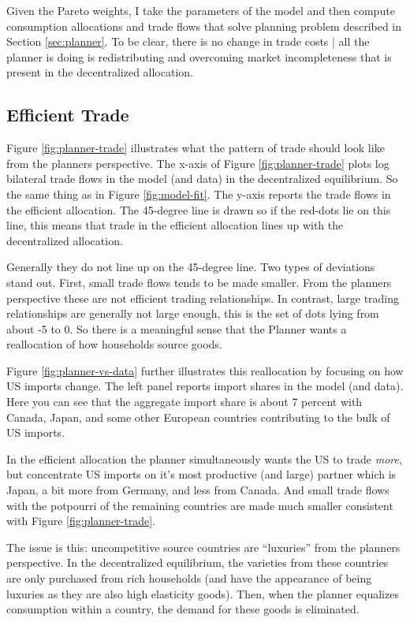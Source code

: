 \documentclass[12pt,pdftex]{article}
\begin{document}
\begin{onehalfspacing}
Given the Pareto weights, I take the parameters of the model and then compute consumption allocations and trade flows that solve planning problem described in Section \ref{sec:planner}. To be clear, there is no change in trade costs | all the planner is doing is redistributing and overcoming market incompleteness that is present in the decentralized allocation.

\subsection{Efficient Trade}

Figure \ref{fig:planner-trade} illustrates what the pattern of trade should look like from the planners perspective. The x-axis of Figure \ref{fig:planner-trade} plots log bilateral trade flows in the model (and data) in the decentralized equilibrium. So the same thing as in Figure \ref{fig:model-fit}. The y-axis reports the trade flows in the efficient allocation. The 45-degree line is drawn so if the red-dots lie on this line, this means that trade in the efficient allocation lines up with the decentralized allocation.

Generally they do not line up on the 45-degree line. Two types of deviations stand out. First, small trade flows tends to be made smaller. From the planners perspective these are not efficient trading relationships. In contrast, large trading relationships are generally not large enough, this is the set of dots lying from about -5 to 0. So there is a meaningful sense that the Planner wants a reallocation of how households source goods.

Figure \ref{fig:planner-vs-data} further illustrates this reallocation by focusing on how US imports change. The left panel reports import shares in the model (and data). Here you can see that the aggregate import share is about 7 percent with Canada, Japan, and some other European countries contributing to the bulk of US imports.

In the efficient allocation the planner simultaneously wants the US to trade \emph{more}, but concentrate US imports on it's most productive (and large) partner which is Japan, a bit more from Germany, and less from Canada. And small trade flows with the potpourri of the remaining countries are made much smaller consistent with Figure \ref{fig:planner-trade}.

The issue is this: uncompetitive source countries are ``luxuries'' from the planners perspective. In the decentralized equilibrium, the varieties from these countries are only purchased from rich households (and have the appearance of being luxuries as they are also high elasticity goods). Then, when the planner equalizes consumption within a country, the demand for these goods is eliminated.


\end{onehalfspacing}
\end{document}
